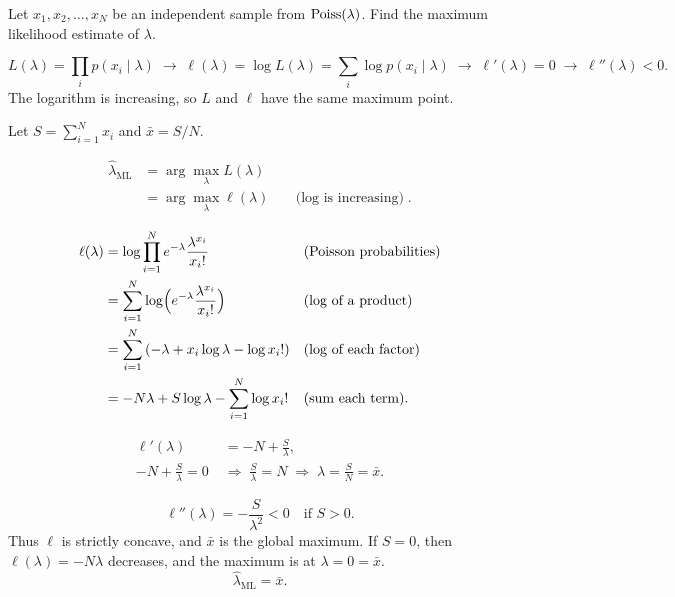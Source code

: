 \label{prob:poisson-mle}
Let $x_1, x_2, \ldots, x_N$ be an independent sample from $\operatorname{Poiss}(\lambda)$.
Find the maximum likelihood estimate of $\lambda$.

\begin{solution}
\[
  L(\lambda) = \prod_{i} p(x_i \mid \lambda)
  \;\to\;
  \ell(\lambda) = \log L(\lambda) = \sum_{i} \log p(x_i \mid \lambda)
  \;\to\;
  \ell'(\lambda) = 0
  \;\to\;
  \ell''(\lambda) < 0.
\]
The logarithm is increasing, so $L$ and $\ell$ have the same maximum
point.

Let $S = \sum_{i=1}^{N} x_i$ and $\bar{x} = S / N$.

\begin{align*}
  \hat{\lambda}_{\mathrm{ML}}
  &= \arg\max_{\lambda} L(\lambda) \\
  &= \arg\max_{\lambda} \ell(\lambda)
    && \text{($\log$ is increasing)}.
\end{align*}

\begin{align*}
  \ell(\lambda)
  &= \log \prod_{i=1}^{N} e^{-\lambda} \frac{\lambda^{x_i}}{x_i!}
    && \text{(Poisson probabilities)} \\
  &= \sum_{i=1}^{N} \log \Bigl( e^{-\lambda} \frac{\lambda^{x_i}}{x_i!} \Bigr)
    && \text{(log of a product)} \\
  &= \sum_{i=1}^{N} \left( -\lambda + x_i \log \lambda - \log x_i! \right)
    && \text{(log of each factor)} \\
  &= -N\lambda + S \log \lambda - \sum_{i=1}^{N} \log x_i!
    && \text{(sum each term)}.
\end{align*}

\begin{align*}
  \ell'(\lambda) &= -N + \frac{S}{\lambda}, \\
  -N + \frac{S}{\lambda} = 0
  \;&\Longrightarrow\; \frac{S}{\lambda} = N
  \;\Longrightarrow\; \lambda = \frac{S}{N} = \bar{x}.
\end{align*}

\[
  \ell''(\lambda) = -\frac{S}{\lambda^2} < 0
  \quad \text{if } S > 0.
\]
Thus $\ell$ is strictly concave, and $\bar{x}$ is the global maximum. If
$S = 0$, then $\ell(\lambda) = -N\lambda$ decreases, and the maximum is at
$\lambda = 0 = \bar{x}$.
\[
  \hat{\lambda}_{\mathrm{ML}} = \bar{x}.
\]
\end{solution}
